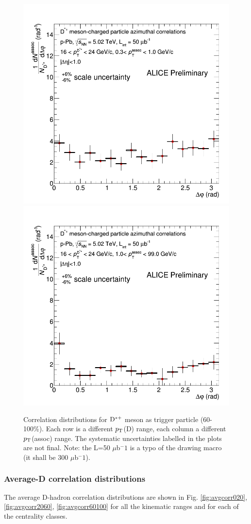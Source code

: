 \begin{figure}
{\includegraphics[width=0.32\linewidth]{figuresVsCent/Dstar/Correlations/60100/CanvaAndVariedHistopPbDstarPt16to24assocPt03to1.png}}
{\includegraphics[width=0.32\linewidth]{figuresVsCent/Dstar/Correlations/60100/CanvaAndVariedHistopPbDstarPt16to24assocPt1to99.png}}
 \caption{Correlation distributions for ${\rm D^{*+}}$ meson as trigger particle (60-100\%). Each row is a different $p_{\rm T}$(D) range, each column a different $p_{\rm T}$(assoc) range. The systematic uncertainties labelled in the plots are not final. Note: the L=50 $\mu$b$^-1$ is a typo of the drawing macro (it shall be 300 $\mu$b$^-1$).}
\label{fig:Dstarcorr60100}
\end{figure}

\subsubsection{Average-D correlation distributions}
The average D-hadron correlation distributions are shown in Fig. \ref{fig:avgcorr020}, \ref{fig:avgcorr2060}, \ref{fig:avgcorr60100} for all the kinematic ranges and for each of the centrality classes.

